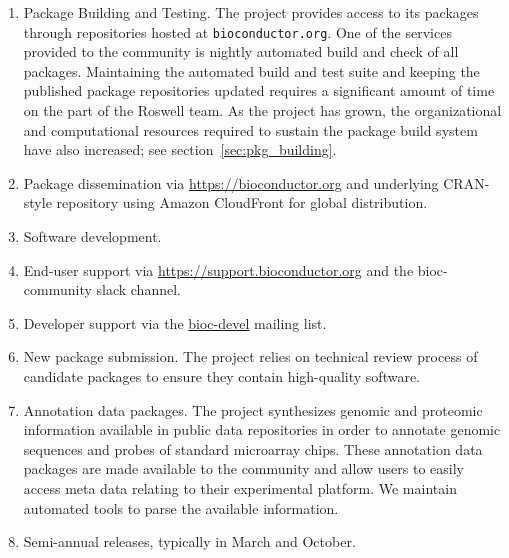 \documentclass[letterpaper]{article}
\begin{document}
\begin{enumerate}

\item Package Building and Testing.  The \Bioconductor{} project
  provides access to its packages through repositories hosted at
  \texttt{bioconductor.org}.  One of the services provided to the
  \Bioconductor{} community is nightly automated build and check of
  all packages.  Maintaining the automated build and test suite and
  keeping the published package repositories updated requires a
  significant amount of time on the part of the Roswell
  \Bioconductor{} team.  As the project has grown, the organizational
  and computational resources required to sustain the package build
  system have also increased; see section~\ref{sec:pkg_building}.

\item Package dissemination via
  \href{https://bioconductor.org}{https://bioconductor.org} and
  underlying CRAN-style repository using Amazon CloudFront for global
  distribution.

\item Software development.

\item End-user support via
  \href{https://support.bioconductor.org}{https://support.bioconductor.org}
  and the bioc-community slack channel.

\item Developer support via the
  \href{https://stat.ethz.ch/mailman/listinfo/bioc-devel}{bioc-devel}
  mailing list.

\item New package submission.  The \Bioconductor{} project relies on
  technical review process of candidate packages to ensure they
  contain high-quality software.

\item Annotation data packages.  The \Bioconductor{} project
  synthesizes genomic and proteomic information available in public
  data repositories in order to annotate genomic sequences and probes
  of standard microarray chips.  These annotation data packages are
  made available to the community and allow \Bioconductor{} users to
  easily access meta data relating to their experimental platform.  We
  maintain automated tools to parse the available information.

\item Semi-annual releases, typically in March and October.

\end{enumerate}
\end{document}
